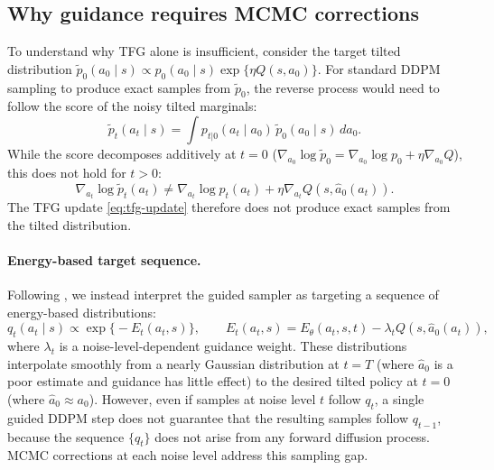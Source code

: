 \documentclass{article}
\theoremstyle{plain}
\theoremstyle{definition}
\theoremstyle{remark}
\begin{document}
\subsection{Why guidance requires MCMC corrections}
\label{sec:why-mcmc}

To understand why TFG alone is insufficient, consider the target tilted distribution $\tilde{p}_0(a_0 \mid s) \propto p_0(a_0 \mid s) \exp\{\eta Q(s, a_0)\}$.
For standard DDPM sampling to produce exact samples from $\tilde{p}_0$, the reverse process would need to follow the score of the noisy tilted marginals:
\begin{equation}
  \tilde{p}_t(a_t \mid s) = \int p_{t|0}(a_t \mid a_0)\, \tilde{p}_0(a_0 \mid s)\, da_0.
  \label{eq:tilted-marginal}
\end{equation}
While the score decomposes additively at $t=0$ ($\nabla_{a_0} \log \tilde{p}_0 = \nabla_{a_0} \log p_0 + \eta \nabla_{a_0} Q$), this does not hold for $t > 0$:
\begin{equation}
  \nabla_{a_t} \log \tilde{p}_t(a_t) \neq \nabla_{a_t} \log p_t(a_t) + \eta \nabla_{a_t} Q(s, \hat{a}_0(a_t)).
  \label{eq:score-mismatch}
\end{equation}
The TFG update \cref{eq:tfg-update} therefore does not produce exact samples from the tilted distribution.

\paragraph{Energy-based target sequence.}
Following \citet{du2023reduce_reuse_recycle}, we instead interpret the guided sampler as targeting a sequence of energy-based distributions:
\begin{equation}
  q_t(a_t \mid s) \propto \exp\bigl\{-E_t(a_t, s)\bigr\}, \qquad
  E_t(a_t, s) = E_\theta(a_t, s, t) - \lambda_t Q(s, \hat{a}_0(a_t)),
  \label{eq:energy-sequence}
\end{equation}
where $\lambda_t$ is a noise-level-dependent guidance weight.
These distributions interpolate smoothly from a nearly Gaussian distribution at $t=T$ (where $\hat{a}_0$ is a poor estimate and guidance has little effect) to the desired tilted policy at $t=0$ (where $\hat{a}_0 \approx a_0$).
However, even if samples at noise level $t$ follow $q_t$, a single guided DDPM step does not guarantee that the resulting samples follow $q_{t-1}$, because the sequence $\{q_t\}$ does not arise from any forward diffusion process.
MCMC corrections at each noise level address this sampling gap.
\end{document}
